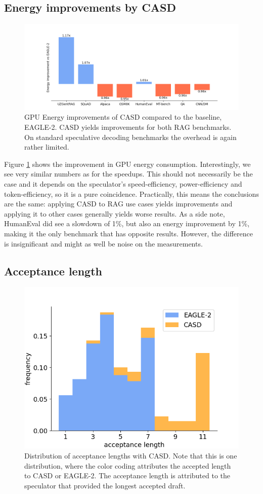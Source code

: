 \subsection{Energy improvements by CASD}
\begin{figure}[h]
  \centering
  \includegraphics[width=\linewidth]{fig/energy_vs_eagle.png}
  \caption{GPU Energy improvements of CASD compared to the baseline, EAGLE-2. CASD yields improvements for both RAG benchmarks. On standard speculative decoding benchmarks the overhead is again rather limited.}
  \label{fig:energy_vs_eagle}
\end{figure}

Figure \ref{fig:energy_vs_eagle} shows the improvement in GPU energy consumption. Interestingly, we see very similar numbers as for the speedups. This should not necessarily be the case and it depends on the speculator's speed-efficiency, power-efficiency and token-efficiency, so it is a pure coincidence. Practically, this means the conclusions are the same: applying CASD to RAG use cases yields improvements and applying it to other cases generally yields worse results. As a side note, HumanEval did see a slowdown of 1\%, but also an energy improvement by 1\%, making it the only benchmark that has opposite results. However, the difference is insignificant and might as well be noise on the measurements.

\subsection{Acceptance length}
\begin{figure}[h]
  \centering
  \includegraphics[width=0.7\linewidth]{fig/acceptance_length.png}
  \caption{Distribution of acceptance lengths with CASD. Note that this is one distribution, where the color coding attributes the accepted length to CASD or EAGLE-2. The acceptance length is attributed to the speculator that provided the longest accepted draft.}
  \label{fig:acceptance_length}
\end{figure}

